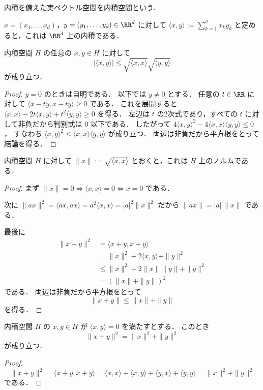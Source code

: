 \begin{definition}[内積空間]
内積を備えた実ベクトル空間を内積空間という．
\end{definition}

\begin{example}
$x=(x_1,\dots,x_d)$，$y=(y_1,\dots,y_d)\in\RR^d$ に対して
$\langle x,y\rangle:=\sum_{k=1}^d x_k y_k$ と定めると，これは $\RR^d$ 上の内積である．
\end{example}

\begin{theorem}
内積空間 $H$ の任意の $x,y\in H$ に対して
\[
|\langle x,y\rangle|
\le
\sqrt{\langle x,x\rangle}\sqrt{\langle y,y\rangle}
\]
が成り立つ．
\end{theorem}
\begin{proof}
$y=0$ のときは自明である．
以下では $y\ne 0$ とする．
任意の $t\in\RR$ に対して
$\langle x-ty,x-ty\rangle\ge 0$ である．
これを展開すると
$\langle x,x\rangle-2t\langle x,y\rangle+t^2\langle y,y\rangle\ge 0$ を得る．
左辺は $t$ の2次式であり，すべての $t$ に対して非負だから判別式は $0$ 以下である．
したがって $4\langle x,y\rangle^2-4\langle x,x\rangle\langle y,y\rangle\le 0$，
すなわち $\langle x,y\rangle^2\le \langle x,x\rangle\langle y,y\rangle$ が成り立つ．
両辺は非負だから平方根をとって結論を得る．
\end{proof}

\begin{corollary}[内積から誘導されるノルム]
内積空間 $H$ に対して
$\|x\|:=\sqrt{\langle x,x\rangle}$ とおくと，これは $H$ 上のノルムである．
\end{corollary}
\begin{proof}
まず $\|x\|=0 \iff \langle x,x\rangle=0 \iff x=0$ である．

次に
$\|ax\|^2=\langle ax,ax\rangle=a^2\langle x,x\rangle=|a|^2\|x\|^2$ だから
$\|ax\|=|a|\,\|x\|$ である．

最後に
\begin{align*}
\|x+y\|^2
&=
\langle x+y,x+y\rangle \\
&=
\|x\|^2+2\langle x,y\rangle+\|y\|^2 \\
&\le
\|x\|^2+2\|x\|\|y\|+\|y\|^2 \\
&=
(\|x\|+\|y\|)^2
\end{align*}
である．
両辺は非負だから平方根をとって
\[
\|x+y\|\le \|x\|+\|y\|
\]
を得る．
\end{proof}

\begin{proposition}[Pythagorasの定理]
内積空間 $H$ の $x,y\in H$ が
$\langle x,y\rangle=0$ を満たすとする．
このとき
\[
\|x+y\|^2=\|x\|^2+\|y\|^2
\]
が成り立つ．
\end{proposition}
\begin{proof}
\[
\|x+y\|^2
=
\langle x+y,x+y\rangle
=
\langle x,x\rangle+\langle x,y\rangle+\langle y,x\rangle+\langle y,y\rangle
=
\|x\|^2+\|y\|^2
\]
である．
\end{proof}

